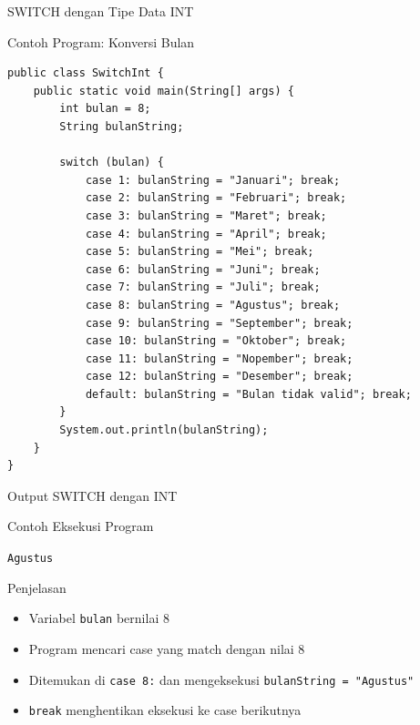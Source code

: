 \documentclass{beamer}
\begin{document}
\begin{frame}[fragile]{SWITCH dengan Tipe Data INT}
  \begin{exampleblock}{Contoh Program: Konversi Bulan}
    \begin{lstlisting}
public class SwitchInt {
    public static void main(String[] args) {
        int bulan = 8;
        String bulanString;
        
        switch (bulan) {
            case 1: bulanString = "Januari"; break;
            case 2: bulanString = "Februari"; break;
            case 3: bulanString = "Maret"; break;
            case 4: bulanString = "April"; break;
            case 5: bulanString = "Mei"; break;
            case 6: bulanString = "Juni"; break;
            case 7: bulanString = "Juli"; break;
            case 8: bulanString = "Agustus"; break;
            case 9: bulanString = "September"; break;
            case 10: bulanString = "Oktober"; break;
            case 11: bulanString = "Nopember"; break;
            case 12: bulanString = "Desember"; break;
            default: bulanString = "Bulan tidak valid"; break;
        }
        System.out.println(bulanString);
    }
}
    \end{lstlisting}
  \end{exampleblock}
\end{frame}

\begin{frame}{Output SWITCH dengan INT}
\begin{block}{Contoh Eksekusi Program}
\colorbox{gray!20}{
    \parbox{0.9\textwidth}{
        \texttt{Agustus}
    }
}
\end{block}

\begin{block}{Penjelasan}
\begin{itemize}
\item Variabel \texttt{bulan} bernilai 8
\item Program mencari case yang match dengan nilai 8
\item Ditemukan di \texttt{case 8:} dan mengeksekusi \texttt{bulanString = "Agustus"}
\item \texttt{break} menghentikan eksekusi ke case berikutnya
\end{itemize}
\end{block}
\end{frame}
\end{document}
